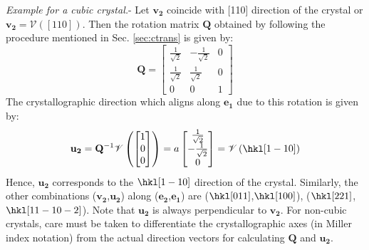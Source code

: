 \documentclass[%
reprint,
 amsmath,amssymb,
 aps,
 prb,
]{revtex4-1}
\newcommand*{\rtten}[1]{\mathbf{\boldsymbol{#1}}}
\newcommand*{\rtvec}[1]{\mathbf{#1}}
\begin{document}
\emph{Example for a cubic crystal.}-
Let $\rtvec{v_2}$ coincide with [110] direction of the crystal or $\rtvec{v_2}=\mathscr{V}([110])$. Then the rotation matrix $\rtten{Q}$ obtained by following the procedure mentioned in Sec. \ref{sec:ctrans} is given by:
\begin{equation*}
\rtten{Q}=\begin{bmatrix}\frac{1}{\sqrt{2}} & -\frac{1}{\sqrt{2}} & 0\\
\frac{1}{\sqrt{2}} & \frac{1}{\sqrt{2}} & 0\\
0 & 0 & 1
\end{bmatrix}
\end{equation*}
The crystallographic direction which aligns along $\rtvec{e_1}$ due to this rotation is given by:
\begin{eqnarray*}
\rtvec{u_2}=\rtten{Q}^{-1}\mathscr{V}\left(\begin{bmatrix}1\\
0\\
0
\end{bmatrix}\right)=a\begin{bmatrix}\frac{1}{\sqrt{2}}\\
-\frac{1}{\sqrt{2}}\\
0
\end{bmatrix}=\mathscr{V}\left( \hkl[1 -1 0]\right)
\end{eqnarray*}
Hence, $\rtvec{u_2}$ corresponds to the $\hkl[1 -1 0]$ direction of the crystal. Similarly, the other combinations ($\rtvec{v_2}$,$\rtvec{u_2}$) along ($\rtvec{e_2}$,$\rtvec{e_1}$) are ($\hkl[0 1 1]$,$\hkl[1 0 0]$),  ($\hkl[2 2 1]$,$\hkl[11 -10  -2]$). Note that $\rtvec{u_2}$ is always perpendicular to $\rtvec{v_2}$. For non-cubic crystals, care must be taken to differentiate the crystallographic axes (in Miller index notation) from the actual direction vectors for calculating $\rtten{Q}$ and $\rtvec{u_2}$.
\end{document}
